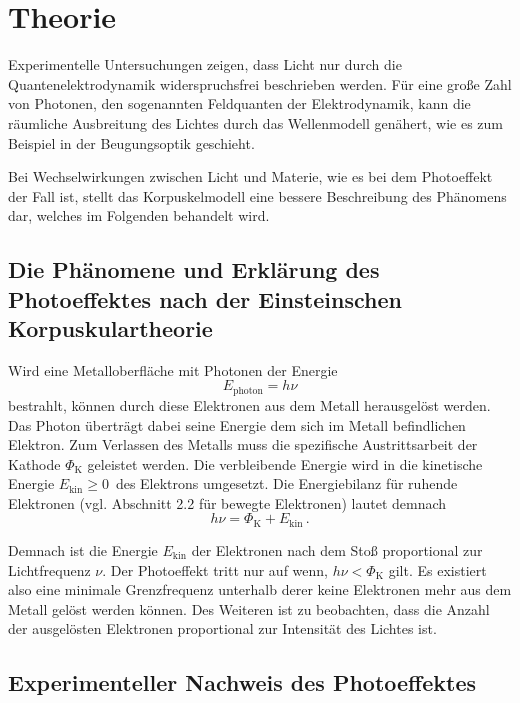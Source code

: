 \section{Theorie}
\label{sec:Theorie}

Experimentelle Untersuchungen zeigen, dass Licht nur durch die Quantenelektrodynamik widerspruchsfrei beschrieben werden.
Für eine große Zahl von Photonen, den sogenannten Feldquanten der Elektrodynamik,
kann die räumliche Ausbreitung des Lichtes durch das Wellenmodell genähert, wie es zum Beispiel in der Beugungsoptik geschieht. 

Bei Wechselwirkungen zwischen Licht und Materie, wie es bei dem Photoeffekt der Fall ist, 
stellt das Korpuskelmodell eine bessere Beschreibung des Phänomens dar, welches im Folgenden behandelt wird.
 

\subsection{Die Phänomene und Erklärung des Photoeffektes nach der Einsteinschen Korpuskulartheorie}

Wird eine Metalloberfläche mit Photonen der Energie
\begin{equation}
    E_\text{photon} = h \nu     \label{eq:photonenenergie}
\end{equation}
bestrahlt, können durch diese Elektronen aus dem Metall herausgelöst werden. 
Das Photon überträgt dabei seine Energie dem sich im Metall befindlichen Elektron. 
Zum Verlassen des Metalls muss die spezifische Austrittsarbeit der Kathode $\Phi_\text{K}$ geleistet werden.
Die verbleibende Energie wird in die kinetische Energie $E_\text{kin} \geq 0 \,$ des Elektrons umgesetzt. 
Die Energiebilanz für ruhende Elektronen (vgl. Abschnitt 2.2 für bewegte Elektronen) lautet demnach
\begin{equation}
    h \nu = \Phi_\text{K} + E_\text{kin} \, .    \label{eq:bilanz_elektron} 
\end{equation}

Demnach ist die Energie $E_\text{kin}$ der Elektronen nach dem Stoß proportional zur Lichtfrequenz $\nu$.
Der Photoeffekt tritt nur auf wenn, $h \nu < \Phi_\text{K}$ gilt.
Es existiert also eine minimale Grenzfrequenz unterhalb derer keine Elektronen mehr aus dem Metall gelöst werden können.
Des Weiteren ist zu beobachten, dass die Anzahl der ausgelösten Elektronen proportional zur Intensität des Lichtes ist.


\subsection{Experimenteller Nachweis des Photoeffektes} \label{sec:nachweis}

